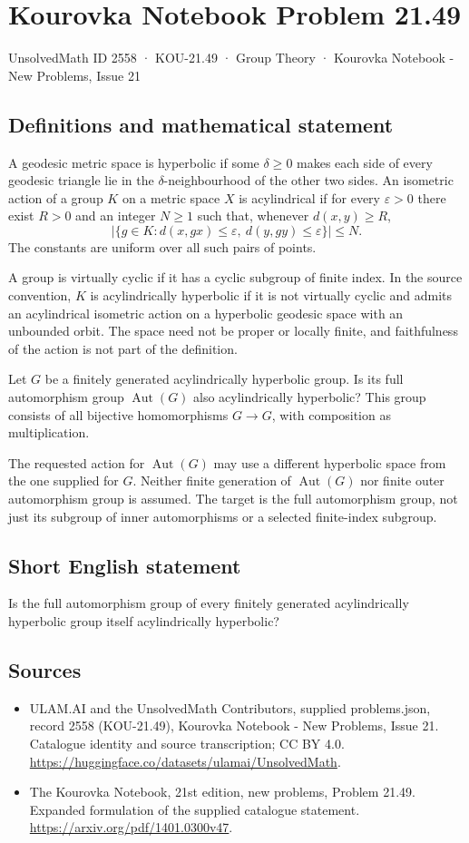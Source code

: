 \documentclass[11pt,a4paper]{article}
\begin{document}
\section*{Kourovka Notebook Problem 21.49}\label{2558}
{\small UnsolvedMath ID 2558 · KOU-21.49 · Group Theory · Kourovka Notebook - New Problems, Issue 21}
\subsection{Definitions and mathematical statement}
A geodesic metric space is hyperbolic if some $\delta\ge0$ makes each
side of every geodesic triangle lie in the $\delta$-neighbourhood of the
other two sides. An isometric action of a group $K$ on a metric space
$X$ is acylindrical if for every $\varepsilon>0$ there exist $R>0$ and
an integer $N\ge1$ such that, whenever $d(x,y)\ge R$,
\[
 |\{g\in K:d(x,gx)\le\varepsilon,
                  \ d(y,gy)\le\varepsilon\}|\le N.
\]
The constants are uniform over all such pairs of points.

A group is virtually cyclic if it has a cyclic subgroup of finite
index. In the source convention, $K$ is acylindrically hyperbolic if
it is not virtually cyclic and admits an acylindrical isometric action
on a hyperbolic geodesic space with an unbounded orbit.
The space need not be proper or locally finite, and faithfulness of
the action is not part of the definition.

Let $G$ be a finitely generated acylindrically hyperbolic group. Is its
full automorphism group $\operatorname{Aut}(G)$ also acylindrically
hyperbolic? This group consists of all bijective homomorphisms $G\to G$,
with composition as multiplication.

The requested action for $\operatorname{Aut}(G)$ may use a different
hyperbolic space from the one supplied for $G$. Neither finite generation
of $\operatorname{Aut}(G)$ nor finite outer automorphism group is assumed.
The target is the full automorphism group, not just its subgroup of
inner automorphisms or a selected finite-index subgroup.
\subsection{Short English statement}
Is the full automorphism group of every finitely generated acylindrically hyperbolic group itself acylindrically hyperbolic?
\subsection{Sources}
\begin{itemize}
\item[S1] ULAM.AI and the UnsolvedMath Contributors, supplied problems.json, record 2558 (KOU-21.49), Kourovka Notebook - New Problems, Issue 21. Catalogue identity and source transcription; CC BY 4.0.
\url{https://huggingface.co/datasets/ulamai/UnsolvedMath}.
\item[S2] The Kourovka Notebook, 21st edition, new problems, Problem 21.49. Expanded formulation of the supplied catalogue statement.
\url{https://arxiv.org/pdf/1401.0300v47}.
\end{itemize}
\end{document}
